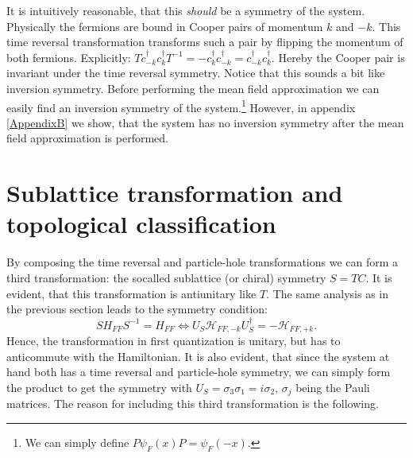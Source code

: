 It is intuitively reasonable, that this \textit{should} be a symmetry of the system. Physically the fermions are bound in Cooper pairs of momentum $k$ and $-k$. This time reversal transformation transforms such a pair by flipping the momentum of both fermions. Explicitly: $Tc^\dagger_{-k}c^\dagger_{k}T^{-1} = -c^\dagger_{k}c^\dagger_{-k} = c^\dagger_{-k}c^\dagger_{k}$. Hereby the Cooper pair is invariant under the time reversal symmetry. Notice that this sounds a bit like inversion symmetry. Before performing the mean field approximation we can easily find an inversion symmetry of the system.\footnote{We can simply define $P\psi_F(x)P = \psi_F(-x)$.} However, in appendix \ref{AppendixB} we show, that the system has no inversion symmetry after the mean field approximation is performed. 

\section{Sublattice transformation and topological classification}
By composing the time reversal and particle-hole transformations we can form a third transformation: the socalled sublattice (or chiral) symmetry $S = TC$. It is evident, that this transformation is antiunitary like $T$. The same analysis as in the previous section leads to the symmetry condition:
\begin{equation}
SH_{FF}S^{-1} = H_{FF} \Leftrightarrow U_S\mathcal{H}_{FF,-k} U^\dagger_S = - \mathcal{H}_{FF,+k}.
\end{equation}
Hence, the transformation in first quantization is unitary, but has to anticommute with the Hamiltonian. It is also evident, that since the system at hand both has a time reversal and particle-hole symmetry, we can simply form the product to get the symmetry with $U_S = \sigma_3\sigma_1 = i\sigma_2$, $\sigma_j$ being the Pauli matrices. The reason for including this third transformation is the following. 

